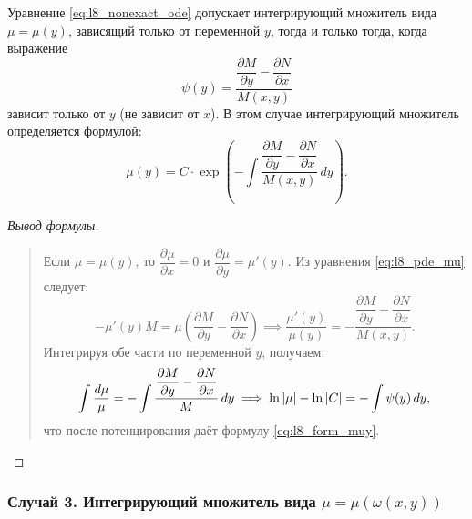 \begin{proposition}
    Уравнение \eqref{eq:l8_nonexact_ode} допускает интегрирующий множитель
    вида $\mu = \mu(y)$, зависящий только от переменной $y$, тогда и только
    тогда, когда выражение
    \begin{equation} \label{eq:l8_cond_muy}
        \psi(y) = \frac{\dfrac{\partial M}{\partial y} -
        \dfrac{\partial N}{\partial x}}{M(x, y)} \tag{11}
    \end{equation}
    зависит только от $y$ (не зависит от $x$). В этом случае интегрирующий
    множитель определяется формулой:
    \begin{equation} \label{eq:l8_form_muy}
        \mu(y) = C \cdot \exp\left(-\int \frac{\dfrac{\partial M}{\partial y} -
        \dfrac{\partial N}{\partial x}}{M(x, y)} \, dy\right). \tag{12}
    \end{equation}
\end{proposition}

\begin{proof}[Вывод формулы]~\\
    \begin{quote}
        Если $\mu = \mu(y)$, то $\dfrac{\partial \mu}{\partial x} = 0$ и
        $\dfrac{\partial \mu}{\partial y} = \mu'(y)$. Из уравнения
        \eqref{eq:l8_pde_mu} следует:
        \[
            -\mu'(y) M = \mu \left(\frac{\partial M}{\partial y} -
            \frac{\partial N}{\partial x}\right) \implies
            \frac{\mu'(y)}{\mu(y)} =
            -\frac{\dfrac{\partial M}{\partial y} -
            \dfrac{\partial N}{\partial x}}{M(x, y)}.
        \]
        Интегрируя обе части по переменной $y$, получаем:
        \[
            \int \frac{d\mu}{\mu} =
            -\int \frac{\dfrac{\partial M}{\partial y} -
            \dfrac{\partial N}{\partial x}}{M} \, dy \implies
            \ln \left| \mu \right| - \ln \left| C \right| = -\int \psi(y) \, dy,
        \]
        что после потенцирования даёт формулу \eqref{eq:l8_form_muy}.
    \end{quote}
\end{proof}

\subsubsection{Случай 3. Интегрирующий множитель вида $\mu = \mu(\omega(x, y))$}

